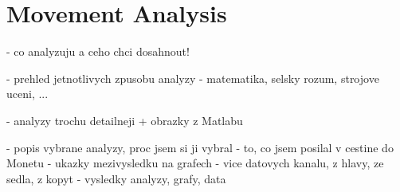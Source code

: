 \chapter{Movement Analysis}

- co analyzuju a ceho chci dosahnout!

- prehled jetnotlivych zpusobu analyzy - matematika, selsky rozum, strojove uceni, ...

- analyzy trochu detailneji + obrazky z Matlabu

- popis vybrane analyzy, proc jsem si ji vybral
- to, co jsem posilal v cestine do Monetu
- ukazky mezivysledku na grafech
- vice datovych kanalu, z hlavy, ze sedla, z kopyt
- vysledky analyzy, grafy, data